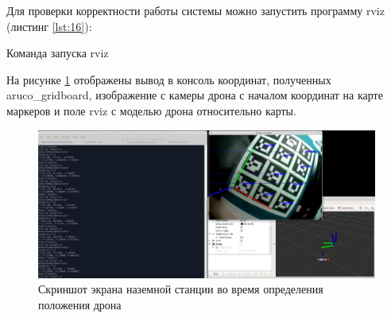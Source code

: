 Для проверки корректности работы системы можно запустить программу rviz (листинг \ref{lst:16}):
\begin{Program}[H]
\caption{Команда запуска rviz} \label{lst:16}
\end{Program}

На рисунке \ref{fig:px4} отображены вывод в консоль координат, полученных aruco\_g\-rid\-board, изображение с камеры дрона с началом координат на карте маркеров и поле rviz с моделью дрона относительно карты.
\begin{figure}[H]
	\centering
	\includegraphics[width=0.9\linewidth]{pics/px4}
	\caption{ Скриншот экрана наземной станции во время определения положения дрона
	}
	\label{fig:px4}
\end{figure}

